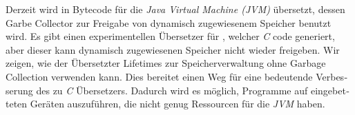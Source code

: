 \begin{otherlanguage}{ngerman}
Derzeit wird \whiley in Bytecode für die \emph{Java Virtual Machine (JVM)} übersetzt, dessen Garbe Collector zur Freigabe von dynamisch zugewiesenem Speicher benutzt wird.
Es gibt einen experimentellen Übersetzer für \whiley, welcher \emph{C} code generiert, aber dieser kann dynamisch zugewiesenen Speicher nicht wieder freigeben.
Wir zeigen, wie der Übersetzter Lifetimes zur Speicherverwaltung ohne Garbage Collection verwenden kann.
Dies bereitet einen Weg für eine bedeutende Verbesserung des \whiley zu \emph{C} Übersetzers.
Dadurch wird es möglich, \whiley Programme auf eingebetteten Geräten auszuführen, die nicht genug Ressourcen für die \emph{JVM} haben.
\end{otherlanguage}
